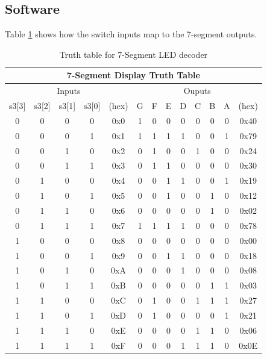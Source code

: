 \documentclass[11pt]{article}
\begin{document}
\subsection{Software}

Table \ref{table:7seg_decoder} shows how the switch inputs map to the 7-segment outputs. \\


\begin{table}[h]
\centering
\begin{tabular}{|c|c|c|c|c|c|c|c|c|c|c|c|c|}
\hline
\multicolumn{13}{|c|}{\textbf{7-Segment Display Truth Table}}                                  \\ \hline
\multicolumn{5}{|c|}{Inputs}                      & \multicolumn{8}{c|}{Ouputs}       \\ \hline
s3{[}3{]} & s3{[}2{]} & s3{[}1{]} & s3{[}0{]} & (hex) & G & F & E & D & C & B & A & (hex) \\ \hline
0        & 0        & 0        & 0        & 0x0   & 1 & 0 & 0 & 0 & 0 & 0 & 0 & 0x40  \\ \hline
0        & 0        & 0        & 1        & 0x1   & 1 & 1 & 1 & 1 & 0 & 0 & 1 & 0x79  \\ \hline
0        & 0        & 1        & 0        & 0x2   & 0 & 1 & 0 & 0 & 1 & 0 & 0 & 0x24  \\ \hline
0        & 0        & 1        & 1        & 0x3   & 0 & 1 & 1 & 0 & 0 & 0 & 0 & 0x30  \\ \hline
0        & 1        & 0        & 0        & 0x4   & 0 & 0 & 1 & 1 & 0 & 0 & 1 & 0x19  \\ \hline
0        & 1        & 0        & 1        & 0x5   & 0 & 0 & 1 & 0 & 0 & 1 & 0 & 0x12  \\ \hline
0        & 1        & 1        & 0        & 0x6   & 0 & 0 & 0 & 0 & 0 & 1 & 0 & 0x02  \\ \hline
0        & 1        & 1        & 1        & 0x7   & 1 & 1 & 1 & 1 & 0 & 0 & 0 & 0x78  \\ \hline
1        & 0        & 0        & 0        & 0x8   & 0 & 0 & 0 & 0 & 0 & 0 & 0 & 0x00  \\ \hline
1        & 0        & 0        & 1        & 0x9   & 0 & 0 & 1 & 1 & 0 & 0 & 0 & 0x18  \\ \hline
1        & 0        & 1        & 0        & 0xA   & 0 & 0 & 0 & 1 & 0 & 0 & 0 & 0x08  \\ \hline
1        & 0        & 1        & 1        & 0xB   & 0 & 0 & 0 & 0 & 0 & 1 & 1 & 0x03  \\ \hline
1        & 1        & 0        & 0        & 0xC   & 0 & 1 & 0 & 0 & 1 & 1 & 1 & 0x27  \\ \hline
1        & 1        & 0        & 1        & 0xD   & 0 & 1 & 0 & 0 & 0 & 0 & 1 & 0x21  \\ \hline
1        & 1        & 1        & 0        & 0xE   & 0 & 0 & 0 & 0 & 1 & 1 & 0 & 0x06  \\ \hline
1        & 1        & 1        & 1        & 0xF   & 0 & 0 & 0 & 1 & 1 & 1 & 0 & 0x0E  \\ \hline
\end{tabular}
\caption{Truth table for 7-Segment LED decoder}
\label{table:7seg_decoder}
\end{table}
\end{document}
